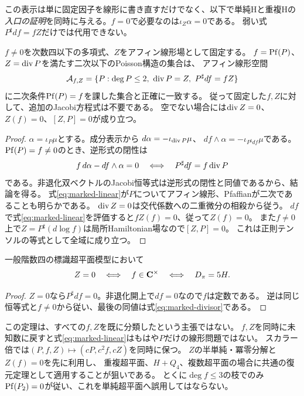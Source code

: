 この表示は単に固定因子を線形に書き直すだけでなく、以下で単純Hと重複Hの
\emph{入口の証明}を同時に与える。$f=0$で必要なのは$\iota_Z\alpha=0$である。
弱い式$P^\sharp df=fZ$だけでは代用できない。

\begin{theorem}\label{thm:modular-reconstruct}
$f\ne0$を次数四以下の多項式、$Z$をアフィン線形場として固定する。
$f=\operatorname{Pf}(P)$、$Z=\operatorname{div} P$を満たす二次以下のPoisson構造の集合は、
アフィン線形空間
\begin{equation}
 \mathcal A_{f,Z}=\{P:\deg P\le2,\ \diver P=Z,\ P^\sharp df=fZ\}
                                                               \label{eq:marked-linear}
\end{equation}
に二次条件$\operatorname{Pf}(P)=f$を課した集合と正確に一致する。
従って固定した$f,Z$に対して、追加のJacobi方程式は不要である。
空でない場合には$\operatorname{div} Z=0$、$Z(f)=0$、$[Z,P]=0$が成り立つ。
\end{theorem}
\begin{proof}
$\alpha=\iota_P\mu$とする。成分表示から
$d\alpha=-\iota_{\operatorname{div} P}\mu$、
$d f\wedge\alpha=-\iota_{P^\sharp df}\mu$である。
$\operatorname{Pf}(P)=f\ne0$のとき、逆形式の閉性は
\[
 f\,d\alpha-df\wedge\alpha=0
 \quad\Longleftrightarrow\quad P^\sharp df=f\operatorname{div} P
\]
である。非退化双ベクトルのJacobi恒等式は逆形式の閉性と同値であるから、結論を得る。
式\eqref{eq:marked-linear}が$P$についてアフィン線形、Pfaffianが二次であることも明らかである。
$\operatorname{div} Z=0$は交代係数への二重微分の相殺から従う。
$df$で式\eqref{eq:marked-linear}を評価すると$fZ(f)=0$、従って$Z(f)=0$。
また$f\ne0$上で$Z=P^\sharp(d\log f)$は局所Hamiltonian場なので$[Z,P]=0$。
これは正則テンソルの等式として全域に成り立つ。
\end{proof}

\begin{corollary}\label{cor:unimodular}
一般階数四の標識超平面模型において
\[
 Z=0\quad\Longleftrightarrow\quad f\in\mathbf C^\times
 \quad\Longleftrightarrow\quad D_\pi=5H.
\]
\end{corollary}
\begin{proof}
$Z=0$なら$P^\sharp df=0$。非退化開上で$df=0$なので$f$は定数である。
逆は同じ恒等式と$f\ne0$から従い、最後の同値は式\eqref{eq:marked-divisor}である。
\end{proof}

この定理は、すべての$f,Z$を既に分類したという主張ではない。
$f,Z$を同時に未知数に戻すと式\eqref{eq:marked-linear}はもはや$P$だけの線形問題ではない。
スカラー倍では$(P,f,Z)\mapsto(cP,c^2f,cZ)$を同時に保つ。
$Z$の半単純・冪零分解と$Z(f)=0$を先に利用し、
重複超平面、$H+Q_4$、複数超平面の場合に共通の復元定理として適用することが狙いである。
とくに$\deg f\le3$の枝でのみ$\operatorname{Pf}(P_2)=0$が従い、これを単純超平面へ誤用してはならない。

